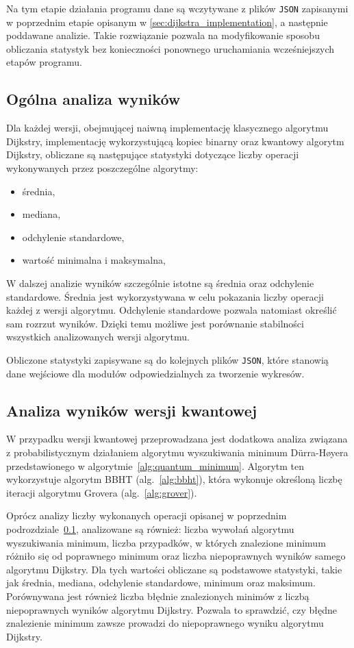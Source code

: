 Na tym etapie działania programu dane są wczytywane z plików \texttt{JSON} zapisanymi w poprzednim etapie opisanym w \ref{sec:dijkstra_implementation}, a następnie poddawane analizie. Takie rozwiązanie pozwala na modyfikowanie sposobu obliczania statystyk bez konieczności ponownego uruchamiania wcześniejszych etapów programu.

\subsection{Ogólna analiza wyników}
\label{subsec:broad_results_analysis}

Dla każdej wersji, obejmującej naiwną implementację klasycznego algorytmu Dijkstry, implementację wykorzystującą kopiec binarny oraz kwantowy algorytm Dijkstry, obliczane są następujące statystyki dotyczące liczby operacji wykonywanych przez poszczególne algorytmy:
\begin{itemize}
\item średnia,
\item mediana,
\item odchylenie standardowe,
\item wartość minimalna i maksymalna,
\end{itemize}
\newpage
W dalszej analizie wyników szczególnie istotne są średnia oraz odchylenie standardowe. Średnia jest wykorzystywana w celu pokazania liczby operacji każdej z wersji algorytmu. Odchylenie standardowe pozwala natomiast określić sam rozrzut wyników. Dzięki temu możliwe jest porównanie stabilności wszystkich analizowanych wersji algorytmu.

Obliczone statystyki zapisywane są do kolejnych plików \texttt{JSON}, które stanowią dane wejściowe dla modułów odpowiedzialnych za tworzenie wykresów.

\subsection{Analiza wyników wersji kwantowej}
\label{subsec:quantum_results_analysis}

W przypadku wersji kwantowej przeprowadzana jest dodatkowa analiza związana z probabilistycznym działaniem algorytmu wyszukiwania minimum Dürra-Høyera przedstawionego w algorytmie~\ref{alg:quantum_minimum}. Algorytm ten wykorzystuje algorytm BBHT (alg.~\ref{alg:bbht}), która wykonuje określoną liczbę iteracji algorytmu Grovera (alg.~\ref{alg:grover}).

Oprócz analizy liczby wykonanych operacji opisanej w  poprzednim podrozdziale~\ref{subsec:broad_results_analysis}, analizowane są również: liczba wywołań algorytmu wyszukiwania minimum, liczba przypadków, w których znalezione minimum różniło się od poprawnego minimum oraz liczba niepoprawnych wyników samego algorytmu Dijkstry. Dla tych wartości obliczane są podstawowe statystyki, takie jak średnia, mediana, odchylenie standardowe, minimum oraz maksimum. Porównywana jest również liczba błędnie znalezionych minimów z liczbą niepoprawnych wyników algorytmu Dijkstry. Pozwala to sprawdzić, czy błędne znalezienie minimum zawsze prowadzi do niepoprawnego wyniku algorytmu Dijkstry.

